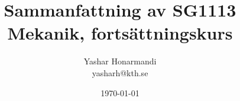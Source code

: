 \documentclass[a4paper, 11pt]{article}
\title{Sammanfattning av SG1113 Mekanik, fortsättningskurs}
\author{Yashar Honarmandi \\ yasharh@kth.se}
\date{\today}
\begin{document}
\maketitle

\begin{abstract}
	
\end{abstract}

\thispagestyle{empty}

\newpage

\tableofcontents

\newpage









\end{document}

